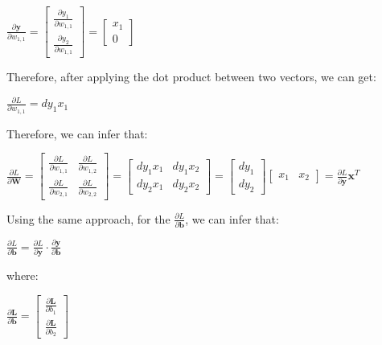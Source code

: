 \documentclass[12pt]{article}
\begin{document}
\begin{center}
    $
    \frac{\partial\textbf{y}}{\partial w_{1,1}}=
    \left[\begin{matrix}
    \frac{\partial y_{1}}{\partial w_{1,1}}\\
    \frac{\partial y_{2}}{\partial w_{1,1}}
    \end{matrix}\right]=
    \left[\begin{matrix}
    x_{1}\\
    0
    \end{matrix}\right]
    $
\end{center}Therefore, after applying the dot product between two vectors, we can get:
\begin{center}
    $
    \frac{\partial  L}{\partial w_{1,1}} = 
    dy_{1}x_{1}
    $
\end{center}Therefore, we can infer that:
\begin{center}
    $\frac{\partial L}{\partial\textbf{W}} = 
    \left[\begin{matrix}
    \frac{\partial L}{\partial w_{1,1}} & \frac{\partial L}{\partial w_{1,2}}\\
    \frac{\partial L}{\partial w_{2,1}} & \frac{\partial L}{\partial w_{2,2}}
    \end{matrix}\right]=
    \left[\begin{matrix}
    dy_{1}x_{1} & dy_{1}x_{2}\\
    dy_{2}x_{1} & dy_{2}x_{2}
    \end{matrix}\right]=
    \left[\begin{matrix}
    dy_{1}\\
    dy_{2}
    \end{matrix}\right]
    \left[\begin{matrix}
    x_{1} & x_{2}
    \end{matrix}\right]=
    \frac{\partial L}{\partial\textbf{y}}\mathbf{x}^T
    $
\end{center}Using the same approach, for the $\frac{\partial L}{\partial \mathbf{b}}$, we can infer that:
\begin{center}
    $\frac{\partial L}{\partial \mathbf{b}} = \frac{\partial L}{\partial \textbf{y}}\cdot\frac{\partial\mathbf{y}}{\partial \mathbf{b}}$
\end{center}where:
\begin{center}
    $
    \frac{\partial\mathbf{L}}{\partial \mathbf{b}}=
    \left[\begin{matrix}
    \frac{\partial\mathbf{L}}{\partial b_{1}} \\
    \frac{\partial\mathbf{L}}{\partial b_{2}} 
    \end{matrix}\right]
    $
\end{center}    
\end{document}
